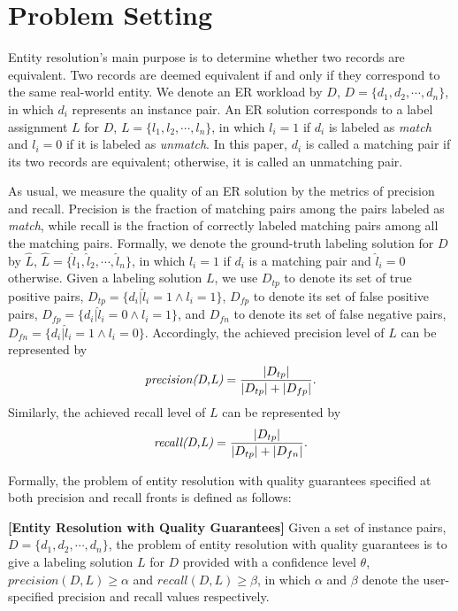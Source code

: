 \section{Problem Setting} \label{sec:setting}

  Entity resolution's main purpose is to determine whether two records are equivalent. Two records are deemed equivalent if and only if they correspond to the same real-world entity. We denote an ER workload by $D$, $D=\{d_1, d_2, \cdots, d_n\}$, in which $d_i$ represents an instance pair.  An ER solution corresponds to a label assignment $L$ for $D$, $L=\{l_1, l_2, \cdots, l_n\}$, in which $l_i=1$ if $d_i$ is labeled as {\em match} and $l_i=0$ if it is labeled as {\em unmatch}. In this paper, $d_i$ is called a matching pair if its two records are equivalent; otherwise, it is called an unmatching pair.

  As usual, we measure the quality of an ER solution by the metrics of precision and recall. Precision is the fraction of matching pairs among the pairs labeled as {\em match}, while recall is the fraction of correctly labeled matching pairs among all the matching pairs. Formally, we denote the ground-truth labeling solution for $D$ by $\hat{L}$, $\hat{L} = \{\hat{l}_1, \hat{l}_2, \cdots, \hat{l}_n\}$, in which $\hat{l}_i=1$ if $d_i$ is a matching pair and $\hat{l}_i=0$ otherwise. Given a labeling solution $L$, we use $D_{tp}$ to denote its set of true positive pairs, $D_{tp}=\{d_i|\hat{l}_i=1 \wedge l_i=1 \}$, $D_{fp}$ to denote its set of false positive pairs, $D_{fp}=\{d_i|\hat{l}_i=0 \wedge l_i=1 \}$, and $D_{fn}$ to denote its set of false negative pairs, $D_{fn}=\{d_i|\hat{l}_i=1 \wedge l_i=0\}$. Accordingly, the achieved precision level of $L$ can be represented by
\begin{equation} \label{eq:precision}
    \emph{precision(D,L)} = \frac{|D_{tp}|}{|D_{tp}| + |D_{fp}|}.
\end{equation}
Similarly, the achieved recall level of $L$ can be represented by
\begin{equation} \label{eq:recall}
    \emph{recall(D,L)} = \frac{|D_{tp}|}{|D_{tp}| + |D_{fn}|}.
\end{equation}

   Formally, the problem of entity resolution with quality guarantees specified at both precision and recall fronts is defined as follows:
\begin{definition}
\label{problemsetting}
{\bf [Entity Resolution with Quality Guarantees]}  Given a set of instance pairs, $D=\{d_1, d_2, \cdots, d_n\}$, the problem of entity resolution with quality guarantees is to give a labeling solution $L$ for $D$ provided with a confidence level $\theta$, $precision(D,L)\geq\alpha$ and $recall(D,L)\geq\beta$, in which $\alpha$ and $\beta$ denote the user-specified precision and recall values respectively.
\end{definition}


